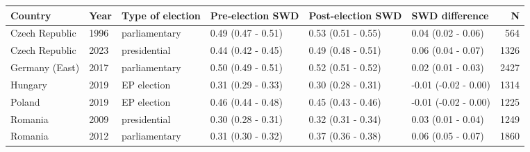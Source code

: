 
\begin{tabular}{l|l|l|l|l|l|r}
\hline
Country & Year & Type of election & Pre-election SWD & Post-election SWD & SWD difference & N\\
\hline
Czech Republic & 1996 & parliamentary & 0.49 (0.47 - 0.51) & 0.53 (0.51 - 0.55) & 0.04 (0.02 - 0.06) & 564\\
\hline
Czech Republic & 2023 & presidential & 0.44 (0.42 - 0.45) & 0.49 (0.48 - 0.51) & 0.06 (0.04 - 0.07) & 1326\\
\hline
Germany (East) & 2017 & parliamentary & 0.50 (0.49 - 0.51) & 0.52 (0.51 - 0.52) & 0.02 (0.01 - 0.03) & 2427\\
\hline
Hungary & 2019 & EP election & 0.31 (0.29 - 0.33) & 0.30 (0.28 - 0.31) & -0.01 (-0.02 - 0.00) & 1314\\
\hline
Poland & 2019 & EP election & 0.46 (0.44 - 0.48) & 0.45 (0.43 - 0.46) & -0.01 (-0.02 - 0.00) & 1225\\
\hline
Romania & 2009 & presidential & 0.30 (0.28 - 0.31) & 0.32 (0.31 - 0.34) & 0.03 (0.01 - 0.04) & 1249\\
\hline
Romania & 2012 & parliamentary & 0.31 (0.30 - 0.32) & 0.37 (0.36 - 0.38) & 0.06 (0.05 - 0.07) & 1860\\
\hline
\end{tabular}
